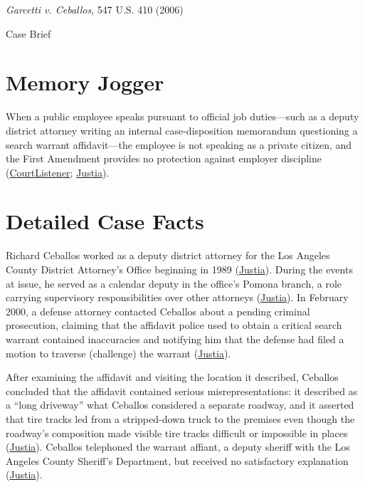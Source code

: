 \documentclass[12pt]{article}
\begin{document}
\begin{center}
{\LARGE \textit{Garcetti v. Ceballos}, 547 U.S. 410 (2006)\par}
\vspace{0.8em}
{\large Case Brief\par}
\end{center}
\vspace{1em}

\section{Memory Jogger}

When a public employee speaks pursuant to official job duties---such as a deputy district attorney writing an internal case-disposition memorandum questioning a search warrant affidavit---the employee is not speaking as a private citizen, and the First Amendment provides no protection against employer discipline (\href{https://www.courtlistener.com/opinion/145653/garcetti-v-ceballos/}{CourtListener}; \href{https://supreme.justia.com/cases/federal/us/547/410/}{Justia}).

\section{Detailed Case Facts}

Richard Ceballos worked as a deputy district attorney for the Los Angeles County District Attorney's Office beginning in 1989 (\href{https://supreme.justia.com/cases/federal/us/547/410/}{Justia}). During the events at issue, he served as a calendar deputy in the office's Pomona branch, a role carrying supervisory responsibilities over other attorneys (\href{https://supreme.justia.com/cases/federal/us/547/410/}{Justia}). In February 2000, a defense attorney contacted Ceballos about a pending criminal prosecution, claiming that the affidavit police used to obtain a critical search warrant contained inaccuracies and notifying him that the defense had filed a motion to traverse (challenge) the warrant (\href{https://supreme.justia.com/cases/federal/us/547/410/}{Justia}).

After examining the affidavit and visiting the location it described, Ceballos concluded that the affidavit contained serious misrepresentations: it described as a ``long driveway'' what Ceballos considered a separate roadway, and it asserted that tire tracks led from a stripped-down truck to the premises even though the roadway's composition made visible tire tracks difficult or impossible in places (\href{https://supreme.justia.com/cases/federal/us/547/410/}{Justia}). Ceballos telephoned the warrant affiant, a deputy sheriff with the Los Angeles County Sheriff's Department, but received no satisfactory explanation (\href{https://supreme.justia.com/cases/federal/us/547/410/}{Justia}).
\end{document}
